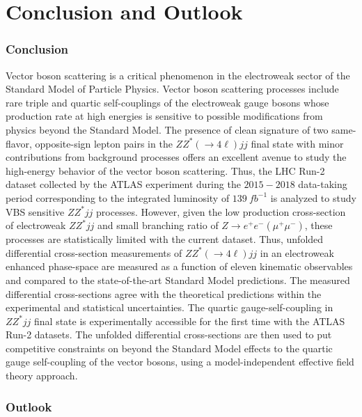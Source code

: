 \part{Conclusion and Outlook}

\section{Conclusion}
\label{sec:Conclusion}

Vector boson scattering is a critical phenomenon in the electroweak sector of the Standard Model of Particle Physics. Vector boson scattering processes include rare triple and quartic self-couplings of the electroweak gauge bosons whose production rate at high energies is sensitive to possible modifications from physics beyond the Standard Model. The presence of clean signature of two same-flavor, opposite-sign lepton pairs in the $ZZ^*(\rightarrow 4\ell) jj$ final state with minor contributions from background processes offers an excellent avenue to study the high-energy behavior of the vector boson scattering. Thus, the LHC Run-2 dataset collected by the ATLAS experiment during the $2015-2018$ data-taking period corresponding to the integrated luminosity of $139 ~fb^{-1}$ is analyzed to study VBS sensitive $ZZ^*jj$ processes. However, given the low production cross-section of electroweak $ZZ^*jj$ and small branching ratio of $Z\rightarrow e^+e^- (\mu^+\mu^-)$, these processes are statistically limited with the current dataset. Thus, unfolded differential cross-section measurements of $ZZ^*(\rightarrow 4\ell) jj$ in an electroweak enhanced phase-space are measured as a function of eleven kinematic observables and compared to the state-of-the-art Standard Model predictions. The measured differential cross-sections agree with the theoretical predictions within the experimental and statistical uncertainties. The quartic gauge-self-coupling in $ZZ^*jj$ final state is experimentally accessible for the first time with the ATLAS Run-2 datasets. The unfolded differential cross-sections are then used to put competitive constraints on beyond the Standard Model effects to the quartic gauge self-coupling of the vector bosons, using a model-independent effective field theory approach. 

\section{Outlook}
\label{sec:Outlook}

